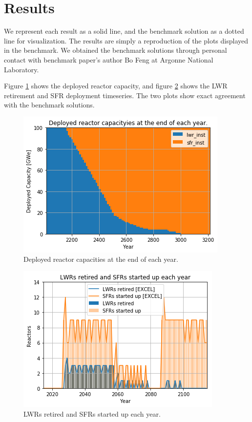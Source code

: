 \section{Results}

We represent each \Cyclus result as a solid line, and the benchmark solution
as a dotted line for visualization. The results are
simply a reproduction of the plots displayed in the benchmark. 
We obtained the benchmark solutions through personal contact with
benchmark paper's author Bo Feng at Argonne National Laboratory.


Figure \ref{fig:pow_plot} shows the deployed reactor capacity, and
figure \ref{fig:dep} shows the \gls{LWR} retirement and \gls{SFR}
deployment timeseries. The two plots show exact agreement with the
benchmark solutions.

\begin{figure}[htbp!]
	\begin{center}
		\includegraphics[scale=0.5]{./images/results_18/power_plot.png}
	\end{center}
        \caption{Deployed reactor capacities at the end of each year.}
	\label{fig:pow_plot}
\end{figure}



\begin{figure}[htbp!]
	\begin{center}
		\includegraphics[scale=0.5]{./images/results_18/dep.png}
	\end{center}
        \caption{\glspl{LWR} retired and \glspl{SFR} started up each year.}
	\label{fig:dep}
\end{figure}

